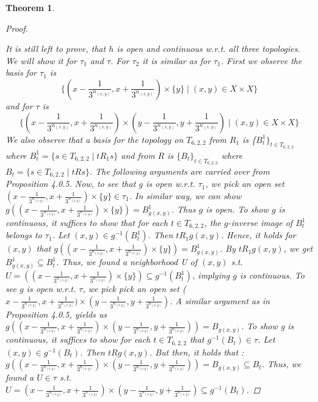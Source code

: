 \documentclass[12pt, a4paper]{scrartcl}
\newtheorem{theorem}[definition]{Theorem}
\begin{document}
\begin{theorem}
\begin{proof}
\begin{figure}[ht]
\begin{center}
\begin{tikzpicture}[scale=0.73]
    \end{tikzpicture}
    \caption{}
\end{center}
\end{figure}    
    It is still left to prove, that $h$ is open and continuous w.r.t. all three topologies. We will show it for $\tau_1$ and $\tau$. For $\tau_2$ it is similar as for $\tau_1$.\newline \newline
    First we observe the basis for $\tau_1$ is 
    $$\{(x - \frac{1}{3^{n_{(x,y)}}}, x +\frac{1}{3^{n_{(x,y)}}}) \times \{y\} \mid (x,y) \in X \times X\}$$
    and for $\tau$ is 
    $$\{(x - \frac{1}{3^{n_{(x,y)}}}, x +\frac{1}{3^{n_{(x,y)}}}) \times (y - \frac{1}{3^{n_{(x,y)}}}, y +\frac{1}{3^{n_{(x,y)}}}) \mid (x,y) \in X \times X\}$$
    We also observe that a basis for the topology on $T_{6,2,2}$ from $R_1$ is \{$B^1_t\}_{t \in T_{6,2,2}}$ where $B^1_t = \{s \in T_{6,2,2} \mid t R_1 s\}$ 
    and from $R$ is $\{B_t\}_{t \in T_{6,2,2}}$ where $B_t = \{s \in T_{6,2,2} \mid t R s\}$. The following arguments are carried over from Proposition 4.0.5. \newline
    Now, to see that $g$ is open w.r.t. $\tau_1$, we pick an open set $(x - \frac{1}{3^{n_{(x,y)}}}, x + \frac{1}{3^{n_{(x,y)}}}) \times \{y\} \in \tau_1$. 
    In similar way, we can show $g((x - \frac{1}{3^{n_{(x,y)}}}, x + \frac{1}{3^{n_{(x,y)}}}) \times \{y\}) = B^1_{g(x,y)}$. Thus $g$ is open.
    To show $g$ is continuous, it suffices to show that for each $t \in T_{6,2,2}$, the $g$-inverse image of $B^1_t$ belongs to $\tau_1$. Let $(x,y) \in g^{-1}(B^1_t)$. 
    Then $tR_1g(x,y)$. Hence, it holds for $(x,y)$ that $g((x - \frac{1}{3^{n_{(x,y)}}}, x + \frac{1}{3^{n_{(x,y)}}}) \times \{y\}) = B^1_{g(x,y)}$. By $t R_1g(x,y)$, we get
    $B^1_{g(x,y)} \subseteq B^1_t$. Thus, we found a neighborhood U of $(x,y)$ s.t. $U = ((x - \frac{1}{3^{n_{(x,y)}}}, x + \frac{1}{3^{n_{(x,y)}}}) \times \{y\}) \subseteq g^{-1}(B^1_t)$, implying $g$ is continuous.  \newline
    To see $g$ is open w.r.t. $\tau$, we pick pick an open set ($x- \frac{1}{3^{n_{(x,y)}}}, x+ \frac{1}{3^{n_{(x,y)}}}) \times (y- \frac{1}{3^{n_{(x,y)}}}, y+ \frac{1}{3^{n_{(x,y)}}})$. A similar argument as in Proposition 4.0.5, yields 
    us $g((x- \frac{1}{3^{n_{(x,y)}}}, x+ \frac{1}{3^{n_{(x,y)}}}) \times (y- \frac{1}{3^{n_{(x,y)}}}, y+ \frac{1}{3^{n_{(x,y)}}})) = B_{g(x,y)}$. \newline
    To show g is continuous, it suffices to show for each $t \in T_{6,2,2}$ that $g^{-1}(B_t) \in \tau$. Let $(x,y) \in g^{-1}(B_t)$. Then $tRg(x,y)$. But then, it holds that :
    $g((x- \frac{1}{3^{n_{(x,y)}}}, x+ \frac{1}{3^{n_{(x,y)}}}) \times (y- \frac{1}{3^{n_{(x,y)}}}, y+ \frac{1}{3^{n_{(x,y)}}})) = B_{g(x,y)} \subseteq B_t$. Thus, we found a $U \in \tau$ 
    s.t. $U = (x- \frac{1}{3^{n_{(x,y)}}}, x+ \frac{1}{3^{n_{(x,y)}}}) \times (y- \frac{1}{3^{n_{(x,y)}}}, y+ \frac{1}{3^{n_{(x,y)}}}) \subseteq g^{-1}(B_t)$.

    \end{proof}

\end{theorem}
\end{document}
